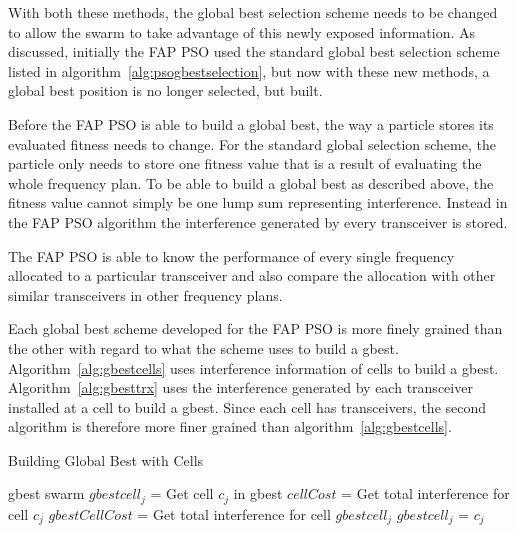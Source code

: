 With both these methods, the global best selection scheme needs to be changed to allow the swarm to take advantage of this newly exposed information. As discussed, initially the \gls{FAP} \gls{PSO} used the standard global best selection scheme listed in algorithm~\ref{alg:psogbestselection}, but now with these new methods, a global best position is no longer selected, but built.

Before the \gls{FAP} \gls{PSO} is able to build a global best, the way a particle stores its evaluated fitness needs to change. For the standard global selection scheme, the particle only needs to store one fitness value that is a result of evaluating the whole frequency plan. To be able to build a global best as described above, the fitness value cannot simply be one lump sum representing interference. Instead in the \gls{FAP} \gls{PSO} algorithm the interference generated by every transceiver is stored.

The \gls{FAP} \gls{PSO} is able to know the performance of every single frequency allocated to a particular transceiver and also compare the allocation with other similar transceivers in other frequency plans.

Each global best scheme developed for the \gls{FAP} \gls{PSO} is more finely grained than the other with regard to what the scheme uses to build a gbest. Algorithm~\ref{alg:gbestcells} uses interference information of cells to build a gbest. Algorithm~\ref{alg:gbesttrx} uses the interference generated by each transceiver installed at a cell to build a gbest. Since each cell has transceivers, the second algorithm is therefore more finer grained than algorithm~\ref{alg:gbestcells}.

\begin{algorithm}[H]
\caption{Building Global Best with Cells}
\label{alg:gbestcells}
\begin{algorithmic}[1]
\Require gbest
\Require swarm
		\State $gbestcell_j$ = Get cell $c_j$ in gbest
		\State $cellCost$ = Get total interference for cell $c_j$
		\State $gbestCellCost$ = Get total interference for cell $gbestcell_j$
			\State $gbestcell_j$ = $c_j$
		\EndIf
	\EndFor
\EndFor
\end{algorithmic}
\end{algorithm}

